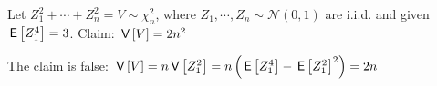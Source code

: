 \documentclass[tf-tutorial-all.tex]{subfiles}
\begin{document}
\begin{truefalse}
Let $Z_1^2 + \cdots + Z_n^2 = V \sim \chi^2_n$, where $Z_1, \cdots ,Z_n \sim \mathcal{N}(0,1)$ are i.i.d. and given $\,\mathsf{E}\left[Z_1^4\right] = 3$. Claim:
$\,\mathsf{V}\left[V\right] = 2n^2$
\begin{solution}
The claim is false: $\,\mathsf{V}\left[V\right] = n\,\mathsf{V}\left[Z_1^2\right] = n\left(\,\mathsf{E}\left[Z_1^4\right] - \,\mathsf{E}\left[Z_1^2\right]^2\right) = 2n$

\end{solution}
\end{truefalse}
\end{document}

